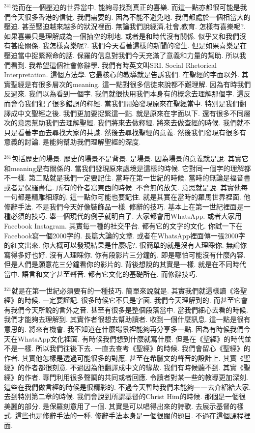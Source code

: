 \documentclass{book}
\begin{document}
$^{241}$從而在一個壓迫的世界當中.
能夠尋找到真正的喜樂.
而這一點亦都很可能是我們今天很多香港的信徒.
我們需要的.
因為不能不避免地.
我們都處於一個相當大的壓迫.
甚至壓迫越來越多的狀況裡面.
無論我們說經濟,社會,教育.
怎樣有喜樂呢?.
如果喜樂只是理解成為一個抽空的利地.
或者是和時代沒有關係.
似乎又和我們沒有甚麼關係.
我怎樣喜樂呢?.
我們今天看著這樣的新聞的發生.
但是如果喜樂是在壓迫當中捉緊照命的話.
保羅的信息對我們今天充滿了意義和力量的幫助.
所以我們看到.
我希望這個社會修辭學.
我們有時英文叫SRI.
Social Rhetorical Interpretation.
這個方法學.
它最核心的教導就是告訴我們.
在聖經的字面以外.
其實聖經是有很多層次的meaning.
這一點對很多信徒來說都不難理解.
因為有時我們反過來.
我們以為看到一個字.
我們就很快用我們本身有的概念去理解那個字.
這反而會令我們犯了很多錯誤的釋經.
當我們開始發現原來在聖經當中.
特別是我們翻譯成中文聖經之後.
我們更加要捉緊這一點.
就是原來在字面以下.
還有很多不同層次的意思幫助我們去理解聖經.
我們將來去做釋經.
將來去做查經的時候.
我們就不只是看著字面去尋找大家的共識.
然後去尋找聖經的意義.
然後我們發現有很多有意義的討論.
是能夠幫助我們理解聖經的深度.

$^{281}$包括歷史的場景.
歷史的場景不是背景.
是場景.
因為場景的意義就是說.
其實它和meaning是有關係的.
當我們發現原來處境是這樣的時候.
它對同一個字的理解都不一樣.
第二點就是我們一定要記住.
當時在第一世紀的時候.
當時的無論是福音書或者是保羅書信.
所有的作者寫東西的時候.
不會無的放矢.
意思就是說.
其實他每一句都是精雕細琢的.
這一點你可能也要記住.
就是其實在當時的羅馬世界裡面.
他修辭手法.
不是我們今天好像裝飾品一樣.
修辭的技巧.
基本上在第一世紀裡面是一種必須的技巧.
舉一個現代的例子就明白了.
大家都會用WhatsApp.
或者大家用Facebook Instagram.
其實每一種的社交平台.
都有它的文字的文化.
你試一下在Facebook寫一個2000字的.
長篇大論的文章.
或者在WhatsApp裡面傳一張2000字的紅文出來.
你大概可以發現結果是什麼呢?.
很簡單的就是沒有人理睬你.
無論你寫得多好也好.
沒有人理睬你.
你有段影片三分鐘的.
即是哪怕可能沒有什麼內容.
但是人們是願意花三分鐘看你的影片的.
背後想說的其實是一樣.
就是在不同時代當中.
語言和文字甚至聲音.
都有它文化的基礎所在.
而修辭技巧.

$^{321}$就是在第一世紀必須要有的一種技巧.
簡單來說就是.
其實我們就這樣讀《洛聖經》的時候.
一定要謹記.
很多時候它不只是字面.
我們今天理解到的.
而甚至它會有我們今天所說的言外之音.
甚至有很多是整個段落當中.
當我們細心去看的時候.
我們才能夠去理解到.
其實作者很想去幫助讀者.
收到一個什麼訊息.
這一點是很有意思的.
將來有機會.
我不知道在什麼場景裡能夠再分享多一點.
因為有時候我們今天在WhatsApp文化裡面.
有時候我們想到什麼就寫什麼.
但是在《聖經》的時代並不是一樣.
所以我們往後下去.
一直去查考《聖經》的時候.
我們會留心《聖經》的作者.
其實他怎樣是透過可能很多的對應.
甚至在希臘文的聲音的設計上.
其實《聖經》的作者都很刻意.
不過因為他翻譯成中文的緣故.
我們有時候聽不到.
其實《聖經》的作者.
專門利用很多聲調的共同或者回應.
令讀者對某一些的教導更加深刻.
這些在我們做言經的時候是很精彩的.
不過今天暫時我們未能夠一一去介紹給大家.
去到特別第二章的時候.
我們會說到所謂基督的Christ Him的時候.
那個是一個很美麗的部分.
是保羅刻意用了一個.
其實是可以唱得出來的詩歌.
去展示基督的樣式.
這些也是修辭手法的一種.
修辭手法本身是一個很闊的題目.
不過在這個課程裡面.
\end{document}
